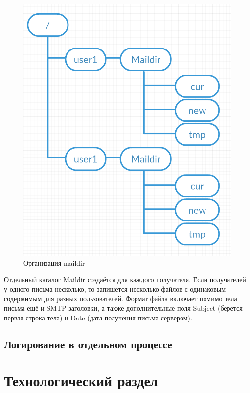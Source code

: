 \documentclass[a4paper,12pt]{report}
\begin{document}
\begin{figure}
\centering
\includegraphics[width=\textwidth]{diagramms/maildir.png}
\caption{Организация maildir}
\label{fig:maildir}
\end{figure}

Отдельный каталог Maildir создаётся для каждого получателя. Если получателей у одного письма несколько, то запишется несколько файлов с одинаковым содержимым для разных пользователей. Формат файла включает помимо тела письма ещё и SMTP-заголовки, а также дополнительные поля Subject (берется первая строка тела) и Date (дата получения письма сервером).


\section{Логирование в отдельном процессе}


\chapter{Технологический раздел}

\end{document}
